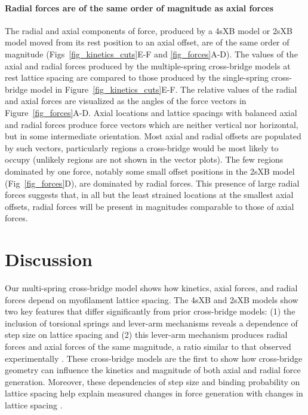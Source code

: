 \documentclass[10pt]{article}
\newcommand{\citep}[1]{\cite{#1}} %
\begin{document}
\paragraph{Radial forces are of the same order of magnitude as axial forces} %
The radial and axial components of force, produced by a 4sXB model or 2sXB model moved from its rest position to an axial offset, are of the same order of magnitude (Figs~\ref{fig_kinetics_cuts}E-F and \ref{fig_forces}A-D). 
The values of the axial and radial forces produced by the multiple-spring cross-bridge models at rest lattice spacing are compared to those produced by the single-spring cross-bridge model in Figure~\ref{fig_kinetics_cuts}E-F.
The relative values of the radial and axial forces are visualized as the angles of the force vectors in Figure~\ref{fig_forces}A-D. 
Axial locations and lattice spacings with balanced axial and radial forces produce force vectors which are neither vertical nor horizontal, but in some intermediate orientation.
Most axial and radial offsets are populated by such vectors, particularly regions a cross-bridge would be most likely to occupy (unlikely regions are not shown in the vector plots). 
The few regions dominated by one force, notably some small offset positions in the 2sXB model (Fig~\ref{fig_forces}D), are dominated by radial forces.
This presence of large radial forces suggests that, in all but the least strained locations at the smallest axial offsets, radial forces will be present in magnitudes comparable to those of axial forces. 



\section*{Discussion} %

Our multi-spring cross-bridge model shows how kinetics, axial forces, and radial forces depend on myofilament lattice spacing.
The 4sXB and 2sXB models show two key features that differ significantly from prior cross-bridge models: (1) the inclusion of torsional springs and lever-arm mechanisms reveals a dependence of step size on lattice spacing and (2) this lever-arm mechanism produces radial forces and axial forces of the same magnitude, a ratio similar to that observed experimentally \citep{Maughan1981, Cecchi1990, Brenner1991}. 
These cross-bridge models are the first to show how cross-bridge geometry can influence the kinetics and magnitude of both axial and radial force generation.
Moreover, these dependencies of step size and binding probability on lattice spacing help explain measured changes in force generation with changes in lattice spacing \citep{Millman1998}. 
\end{document}

